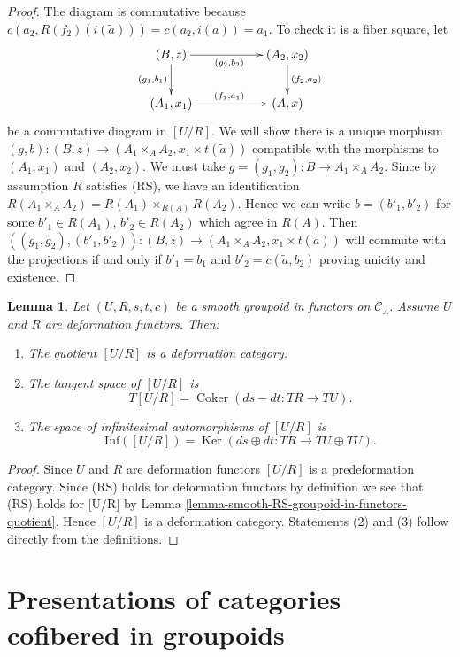 \documentclass{stacks-project}
\theoremstyle{plain}
\newtheorem{lemma}[subsection]{Lemma}
\theoremstyle{definition}
\theoremstyle{remark}
\numberwithin{equation}{subsection}
\def\Ker{\mathop{\mathrm{Ker}}}
\def\Coker{\mathop{\mathrm{Coker}}}
\begin{document}
\begin{proof}
\medskip\noindent
The diagram is commutative because
$c(a_2, R(f_2)(i(\widetilde{a}))) = c(a_2, i(a)) = a_1$.
To check it is a fiber square, let
$$
\xymatrix{
(B, z) \ar[d]_{(g_1, b_1)} \ar[rr]_{(g_2, b_2)} & & (A_2, x_2)
\ar[d]^{(f_2, a_2)} \\
(A_1, x_1) \ar[rr]^{(f_1, a_1)} & & (A, x)
}
$$
be a commutative diagram in $[U/R]$. We will show there is a unique morphism
$(g, b) : (B, z) \to (A_1 \times_A A_2, x_1 \times t(\widetilde{a}))$
compatible with the morphisms to $(A_1, x_1)$ and $(A_2, x_2)$.
We must take $g = (g_1, g_2) : B \to A_1 \times_A A_2$.
Since by assumption $R$ satisfies (RS), we have an identification
$R(A_1 \times_A A_2) = R(A_1) \times_{R(A)} R(A_2)$.
Hence we can write $b = (b'_1, b'_2)$ for some
$b'_1 \in R(A_1)$, $b'_2 \in R(A_2)$ which agree in $R(A)$.
Then
$((g_1, g_2), (b'_1, b'_2)) : (B, z) \to
(A_1 \times_A A_2, x_1 \times t(\widetilde{a}))$
will commute with the projections if and only if
$b'_1 = b_1$ and $b'_2 = c(\widetilde{a}, b_2)$ proving unicity and
existence.
\end{proof}

\begin{lemma}
\label{lemma-deformation-groupoid-quotient}
Let $(U, R, s, t, c)$ be a smooth groupoid in functors on $\mathcal{C}_\Lambda$.
Assume $U$ and $R$ are deformation functors. Then:
\begin{enumerate}
\item The quotient $[U/R]$ is a deformation category.
\item The tangent space of $[U/R]$ is
$$
T[U/R] = \Coker(ds-dt: TR \to TU).
$$
\item The space of infinitesimal automorphisms of $[U/R]$ is
$$
\text{Inf}([U/R]) =
\Ker(ds \oplus dt : TR \to TU \oplus TU).
$$
\end{enumerate}
\end{lemma}

\begin{proof}
Since $U$ and $R$ are deformation functors $[U/R]$ is a predeformation
category. Since (RS) holds for deformation functors by
definition we see that (RS) holds for [U/R] by
Lemma \ref{lemma-smooth-RS-groupoid-in-functors-quotient}.
Hence $[U/R]$ is a deformation category. Statements (2) and (3)
follow directly from the definitions.
\end{proof}







\section{Presentations of categories cofibered in groupoids}
\label{section-presentation-categories-cofibred-in-groupoids}
\end{document}
